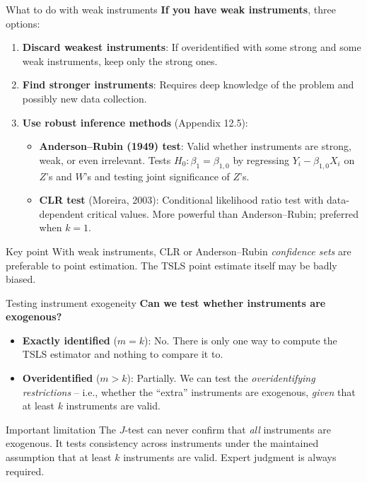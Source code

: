 \documentclass[10pt]{beamer}
\begin{document}
\begin{frame}{What to do with weak instruments}
\label{slide:weak_remedies}
\textbf{If you have weak instruments}, three options:

\begin{enumerate}
  \item \textbf{Discard weakest instruments}: If overidentified with some strong and some weak instruments, keep only the strong ones.

  \pause
  \item \textbf{Find stronger instruments}: Requires deep knowledge of the problem and possibly new data collection.

  \pause
  \item \textbf{Use robust inference methods} (Appendix 12.5):
  \begin{itemize}
    \item \textbf{Anderson--Rubin (1949) test}: Valid whether instruments are strong, weak, or even irrelevant. Tests $H_0: \beta_1 = \beta_{1,0}$ by regressing $Y_i - \beta_{1,0}X_i$ on $Z$'s and $W$'s and testing joint significance of $Z$'s.
    \item \textbf{CLR test} (Moreira, 2003): Conditional likelihood ratio test with data-dependent critical values. More powerful than Anderson--Rubin; preferred when $k=1$.
  \end{itemize}
\end{enumerate}

\pause
\begin{alertblock}{Key point}
With weak instruments, CLR or Anderson--Rubin \emph{confidence sets} are preferable to point estimation. The TSLS point estimate itself may be badly biased.
\end{alertblock}
\end{frame}

\begin{frame}{Testing instrument exogeneity}
\label{slide:exogeneity_testing}
\textbf{Can we test whether instruments are exogenous?}

\begin{itemize}
  \item \textbf{Exactly identified} ($m = k$): \alert{No}. There is only one way to compute the TSLS estimator and nothing to compare it to.

  \pause
  \item \textbf{Overidentified} ($m > k$): \alert{Partially}. We can test the \emph{overidentifying restrictions} -- i.e., whether the ``extra'' instruments are exogenous, \emph{given} that at least $k$ instruments are valid.
\end{itemize}

\pause
\begin{alertblock}{Important limitation}
The $J$-test can never confirm that \emph{all} instruments are exogenous. It tests consistency across instruments under the maintained assumption that at least $k$ instruments are valid. Expert judgment is always required.
\end{alertblock}
\end{frame}
\end{document}
